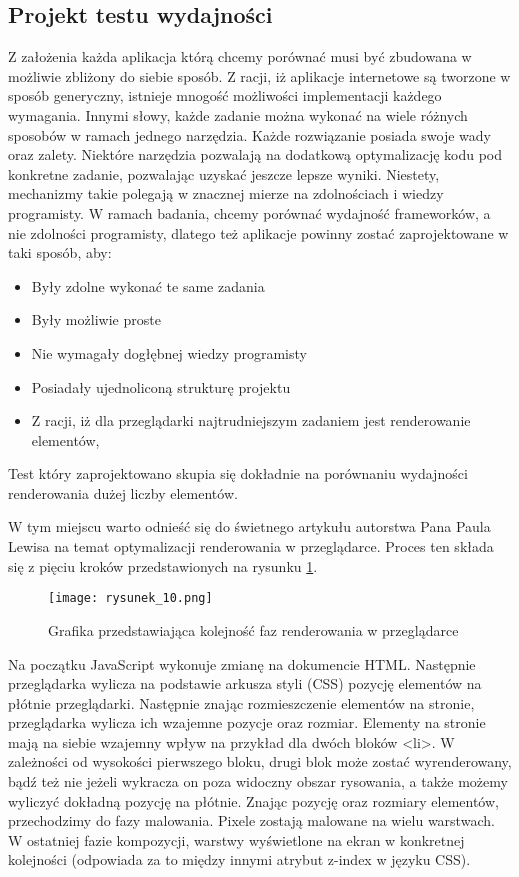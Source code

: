 \subsection{Projekt testu wydajności}
Z założenia każda aplikacja którą chcemy porównać musi być zbudowana w możliwie zbliżony do siebie sposób.
Z racji, iż aplikacje internetowe są tworzone w sposób generyczny, istnieje mnogość możliwości implementacji każdego wymagania.
Innymi słowy, każde zadanie można wykonać na wiele różnych sposobów w ramach jednego narzędzia.
Każde rozwiązanie posiada swoje wady oraz zalety. Niektóre narzędzia pozwalają na dodatkową optymalizację kodu pod konkretne zadanie, pozwalając uzyskać jeszcze lepsze wyniki.
Niestety, mechanizmy takie polegają w znacznej mierze na zdolnościach i wiedzy programisty.
W ramach badania, chcemy porównać wydajność frameworków, a nie zdolności programisty, dlatego też aplikacje powinny zostać zaprojektowane w taki sposób, aby:
\begin{itemize}
    \item Były zdolne wykonać te same zadania
    \item Były możliwie proste
    \item Nie wymagały dogłębnej wiedzy programisty
    \item Posiadały ujednoliconą strukturę projektu
    \item Z racji, iż dla przeglądarki najtrudniejszym zadaniem jest renderowanie elementów,     
\end{itemize}
Test który zaprojektowano skupia się dokładnie na porównaniu wydajności renderowania dużej liczby elementów.

W tym miejscu warto odnieść się do świetnego artykułu autorstwa Pana Paula Lewisa \cite{rendering-performance} na temat optymalizacji renderowania w przeglądarce. Proces ten składa się z pięciu kroków przedstawionych na rysunku \ref{fig:rysunek_10}. 

\begin{figure}[htbp]
    \centering
    \texttt{[image: rysunek\_10.png]}
    \caption{Grafika przedstawiająca kolejność faz renderowania w przeglądarce}
    \label{fig:rysunek_10}
\end{figure}

Na początku JavaScript wykonuje zmianę na dokumencie HTML.
Następnie przeglądarka wylicza na podstawie arkusza styli (CSS) pozycję elementów na płótnie przeglądarki.
Następnie znając rozmieszczenie elementów na stronie, przeglądarka wylicza ich wzajemne pozycje oraz rozmiar.
Elementy na stronie mają na siebie wzajemny wpływ na przykład dla dwóch bloków <li>.
W zależności od wysokości pierwszego bloku, drugi blok może zostać wyrenderowany, bądź też nie jeżeli wykracza on poza widoczny obszar rysowania, a także możemy wyliczyć dokładną pozycję na płótnie.
Znając pozycję oraz rozmiary elementów, przechodzimy do fazy malowania.
Pixele zostają malowane na wielu warstwach. W ostatniej fazie kompozycji, warstwy wyświetlone na ekran w konkretnej kolejności (odpowiada za to między innymi atrybut z-index w języku CSS).

